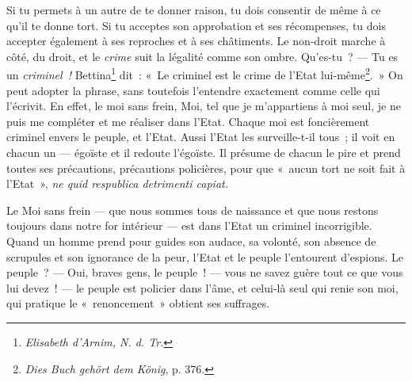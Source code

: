 \documentclass[french,twoside]{book} %
\begin{document}
\noindent Si tu permets à un autre de te donner raison, tu dois consentir de même à ce qu’il te donne tort. Si tu acceptes son approbation et ses récompenses, tu dois accepter également à ses reproches et à ses châtiments. Le non-droit marche à côté, du droit, et le \emph{crime} suit la légalité comme son ombre. Qu’es-tu ? — Tu es un \emph{criminel !} Bettina\footnote{ \noindent \emph{Elisabeth d’Arnim, N. d. Tr.}
 } dit : « Le criminel est  le crime de l’Etat lui-même\footnote{ \noindent \emph{Dies Buch gehört dem König}, p. 376.
 }. » On peut adopter la phrase, sans toutefois l’entendre exactement comme celle qui l’écrivit. En effet, le moi sans frein, Moi, tel que je m’appartiens à moi seul, je ne puis me compléter et me réaliser dans l’Etat. Chaque moi est foncièrement criminel envers le peuple, et l’Etat. Aussi l’Etat les surveille-t-il tous ; il voit en chacun un — égoïste et il redoute l’égoïste. Il présume de chacun le pire et prend toutes ses précautions, précautions policières, pour que « aucun tort ne soit fait à l’Etat », \emph{ne quid respublica detrimenti capiat.}\par
Le Moi sans frein — que nous sommes tous de naissance et que nous restons toujours dans notre for intérieur — est dans l’Etat un criminel incorrigible. Quand un homme prend pour guides son audace, sa volonté, son absence de scrupules et son ignorance de la peur, l’Etat et le peuple l’entourent d’espions. Le peuple ? — Oui, braves gens, le peuple ! — vous ne savez guère tout ce que vous lui devez ! — le peuple est policier dans l’âme, et celui-là seul qui renie son moi, qui pratique le « renoncement » obtient ses suffrages.\par
\end{document}
